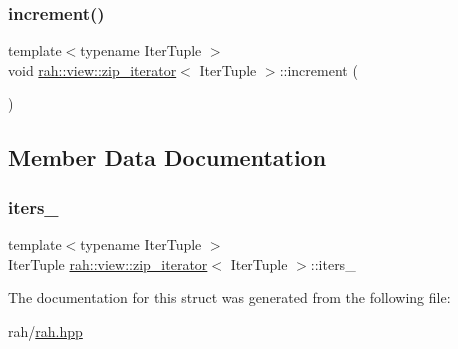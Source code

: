 \subsubsection{\texorpdfstring{increment()}{increment()}}
{\footnotesize\ttfamily template$<$typename Iter\+Tuple $>$ \\
void \mbox{\hyperlink{structrah_1_1view_1_1zip__iterator}{rah\+::view\+::zip\+\_\+iterator}}$<$ Iter\+Tuple $>$\+::increment (\begin{DoxyParamCaption}{ }\end{DoxyParamCaption})\hspace{0.3cm}{\ttfamily [inline]}}



\subsection{Member Data Documentation}
\mbox{\label{structrah_1_1view_1_1zip__iterator_a58f5f6dd935fe51dd3c3a28e3b06ecc9}} 
\subsubsection{\texorpdfstring{iters\_}{iters\_}}
{\footnotesize\ttfamily template$<$typename Iter\+Tuple $>$ \\
Iter\+Tuple \mbox{\hyperlink{structrah_1_1view_1_1zip__iterator}{rah\+::view\+::zip\+\_\+iterator}}$<$ Iter\+Tuple $>$\+::iters\+\_\+}



The documentation for this struct was generated from the following file\+:\begin{DoxyCompactItemize}
\item 
rah/\mbox{\hyperlink{rah_8hpp}{rah.\+hpp}}\end{DoxyCompactItemize}
